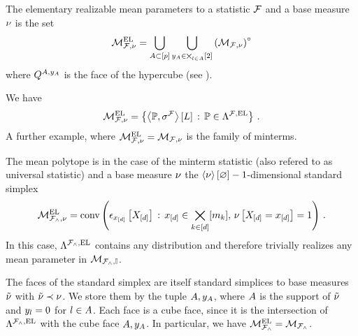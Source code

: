\begin{definition}
    The elementary realizable mean parameters to a statistic $\mathcal{F}$ and a base measure $\nu$ is the set
    \begin{align*}
        \mathcal{M}^{\mathrm{EL}}_{\mathcal{F},\nu}
        = \bigcup_{A\subset[p]} \bigcup_{y_{A}\in\bigtimes_{l\in A}[2]} {\left(\mathcal{M}_{\mathcal{F},\nu}\right)}^{\circ}
    \end{align*}
    where $Q^{A,y_{A}}$ is the face of the hypercube (see ).
\end{definition}

    We have
    \begin{align*}
        \mathcal{M}^{\mathrm{EL}}_{\mathcal{F},\nu}
        = \left\{ \left\langle \mathbb{P},\sigma^{\mathcal{F}}\right\rangle \left[ L \right] \,:\, \mathbb{P}\in\Lambda^{\mathcal{F},\mathrm{EL}} \right\} \, .
    \end{align*}
A further example, where $\mathcal{M}^{\mathrm{EL}}_{\mathcal{F},\nu}=\mathcal{M}_{\mathcal{F},\nu}$ is the family of minterms.

\begin{example}\label{exa:mintermHLNSet}
    The mean polytope is in the case of the minterm statistic (also refered to as universal statistic) and a base measure $\nu$ the $\left\langle \nu\right\rangle \left[ \varnothing \right]-1$-dimensional standard simplex
    \begin{align*}
        \mathcal{M}^{\mathrm{EL}}_{\mathcal{F}_{\land},\nu}
        = \mathrm{conv}\left(\epsilon_{x_{[d]}}\left[X_{[d]}\right]\,:\,x_{[d]}\in\bigtimes_{k\in[d]}[m_{k}],\,\nu\left[X_{[d]}=x_{[d]}\right]=1\right) \, .
    \end{align*}
    In this case, $\Lambda^{\mathcal{F}_{\land},\mathrm{EL}}$ contains any distribution and therefore trivially realizes any mean parameter in $\mathcal{M}_{\mathcal{F}_{\land},\mathbb{I}}$.

    The faces of the standard simplex are itself standard simplices to base measures $\tilde{\nu}$ with $\tilde{\nu}\prec\nu$.
    We store them by the tuple $A,y_{A}$, where $A$ is the support of $\tilde{\nu}$ and $y_{l}=0$ for $l\in A$.
    Each face is a cube face, since it is the intersection of $\Lambda^{\mathcal{F}_{\land},\mathrm{EL}}$ with the cube face $A,y_{A}$.
    In particular, we have $\mathcal{M}^{\mathrm{EL}}_{\mathcal{F}_{\land}}=\mathcal{M}_{\mathcal{F}_{\land}}$.
\end{example}


